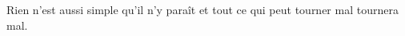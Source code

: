 %
    {Rien n’est aussi simple qu’il n’y paraît et tout ce qui peut tourner mal tournera mal.}%
    {}

